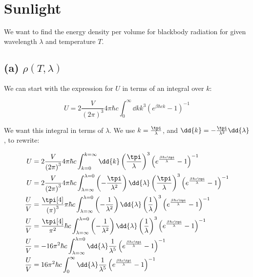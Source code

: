 \documentclass[../../PS3.tex]{subfiles}
\begin{document}
\section{Sunlight}

We want to find the energy density per volume for blackbody radiation for given wavelength $\lambda$ and temperature $T$.

\subsection*{(a) $\rho(T, \lambda)$}

We can start with the expression for $U$ in terms of an integral over $k$:

\begin{equation}
	U = 2 \frac{V}{\left(2\pi\right)^3} 4 \pi \hbar c \int_0^\infty \dd{k} k^3 \left(e^{\beta \hbar c k} - 1\right)^{-1}
\end{equation}

We want this integral in terms of $\lambda$. We use $k = \frac{\tpi}{\lambda}$, and $\dd{k} = - \frac{\tpi}{\lambda^2} \dd{\lambda}$, to rewrite:

\begin{align}
	U &= 2 \frac{V}{\left(2\pi\right)^3} 4 \pi \hbar c \int_{k=0}^{k=\infty} \dd{k} \left(\frac{\tpi}{\lambda}\right)^3 \left(e^{ \frac{\beta \hbar c \tpi}{\lambda}} - 1\right)^{-1} \\
	U &=  2 \frac{V}{\left(2\pi\right)^3} 4 \pi \hbar c \int_{\lambda=\infty}^{\lambda = 0} \left(-\frac{\tpi}{\lambda^2}\right) \dd{\lambda} \left(\frac{\tpi}{\lambda}\right)^3 \left(e^{ \frac{\beta \hbar c \tpi}{\lambda}} - 1\right)^{-1} \\
	\frac{U}{V} &=   \frac{\tpi[4]}{\left(\pi\right)^3}  \pi \hbar c \int_{\lambda=\infty}^{\lambda = 0} \left(-\frac{1}{\lambda^2}\right) \dd{\lambda} \left(\frac{1}{\lambda}\right)^3 \left(e^{ \frac{\beta \hbar c \tpi}{\lambda}} - 1\right)^{-1} \\
	\frac{U}{V} &= \frac{\tpi[4]}{\pi^2}   \hbar c \int_{\lambda=\infty}^{\lambda = 0} \left(-\frac{1}{\lambda^2}\right) \dd{\lambda} \left(\frac{1}{\lambda}\right)^3 \left(e^{ \frac{\beta \hbar c \tpi}{\lambda}} - 1\right)^{-1} \\
	\frac{U}{V} &= - 16 \pi^2 \hbar c \int_{\lambda=\infty}^{\lambda = 0}  \dd{\lambda} \frac{1}{\lambda^5} \left(e^{ \frac{\beta \hbar c \tpi}{\lambda}} - 1\right)^{-1} \\
	\frac{U}{V} &= 16 \pi^2 \hbar c \int_{0}^{\infty}  \dd{\lambda} \frac{1}{\lambda^5} \left(e^{ \frac{\beta \hbar c \tpi}{\lambda}} - 1\right)^{-1}
\end{align}
\end{document}
